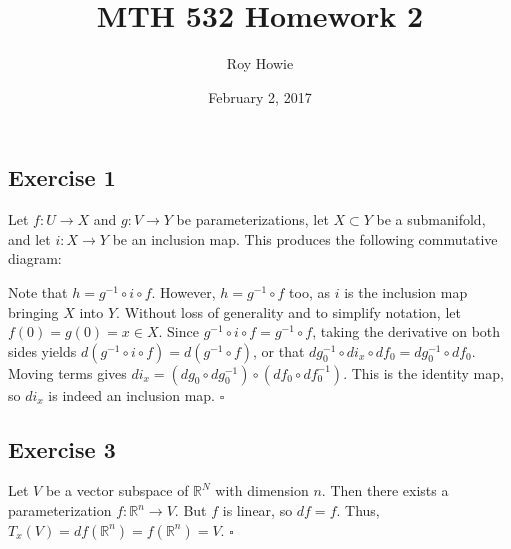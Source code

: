 \documentclass{article}
\begin{document}
\title{MTH 532 Homework 2}
\author{Roy Howie}
\date{February 2, 2017}
\maketitle

\subsection*{Exercise 1}
Let $f\colon U\to X$ and $g\colon V\to Y$ be parameterizations,
let $X\subset Y$ be a submanifold, and
let $i\colon X\to Y$ be an inclusion map. This produces the following
commutative diagram:

\begin{center}
\end{center}
Note that $h=g^{-1} \circ i \circ f$. However,
$h=g^{-1}\circ f$ too, as $i$ is the inclusion map
bringing $X$ into $Y$.
Without loss of generality and to simplify notation,
let $f(0)=g(0)=x\in X$.
Since $g^{-1} \circ i \circ f = g^{-1}\circ f$, taking
the derivative on both sides yields
$d(g^{-1} \circ i \circ f)=d(g^{-1}\circ f)$,
or that $dg^{-1}_0\circ di_x\circ df_0=dg^{-1}_0\circ df_0$.
Moving terms gives
$di_x=(dg_0\circ dg^{-1}_0)\circ (df_0\circ df^{-1}_0)$.
This is the identity map, so $di_x$ is indeed an inclusion map.
\hfill $\square$

\subsection*{Exercise 3}
Let $V$ be a vector subspace of $\mathbb{R}^N$ with
dimension $n$. Then there exists a parameterization
$f\colon\mathbb{R}^n\to V$. But $f$ is linear, so
$df=f$. Thus, $T_x(V)=df(\mathbb{R}^n)=f(\mathbb{R}^n)=V$.
\hfill $\square$
\end{document}

